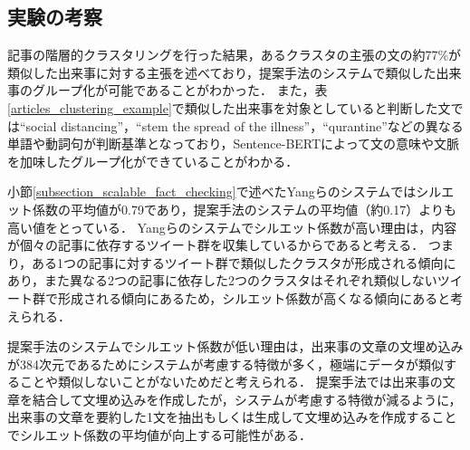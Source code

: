 \documentclass[12pt,a4j]{jreport}
\begin{document}

\subsection{実験の考察}
記事の階層的クラスタリングを行った結果，あるクラスタの主張の文の約77\%が類似した出来事に対する主張を述べており，提案手法のシステムで類似した出来事のグループ化が可能であることがわかった．
また，表\ref{articles_clustering_example}で類似した出来事を対象としていると判断した文では``social distancing''，``stem the spread of the illness''，``qurantine''などの異なる単語や動詞句が判断基準となっており，Sentence-BERTによって文の意味や文脈を加味したグループ化ができていることがわかる．

小節\ref{subsection_scalable_fact_checking}で述べたYangらのシステムではシルエット係数の平均値が0.79であり，提案手法のシステムの平均値（約0.17）よりも高い値をとっている\cite{yang_scalable_2021}．
Yangらのシステムでシルエット係数が高い理由は，内容が個々の記事に依存するツイート群を収集しているからであると考える．
つまり，ある1つの記事に対するツイート群で類似したクラスタが形成される傾向にあり，また異なる2つの記事に依存した2つのクラスタはそれぞれ類似しないツイート群で形成される傾向にあるため，シルエット係数が高くなる傾向にあると考えられる．

提案手法のシステムでシルエット係数が低い理由は，出来事の文章の文埋め込みが384次元であるためにシステムが考慮する特徴が多く，極端にデータが類似することや類似しないことがないためだと考えられる．
提案手法では出来事の文章を結合して文埋め込みを作成したが，システムが考慮する特徴が減るように，出来事の文章を要約した1文を抽出もしくは生成して文埋め込みを作成することでシルエット係数の平均値が向上する可能性がある．
\end{document}
